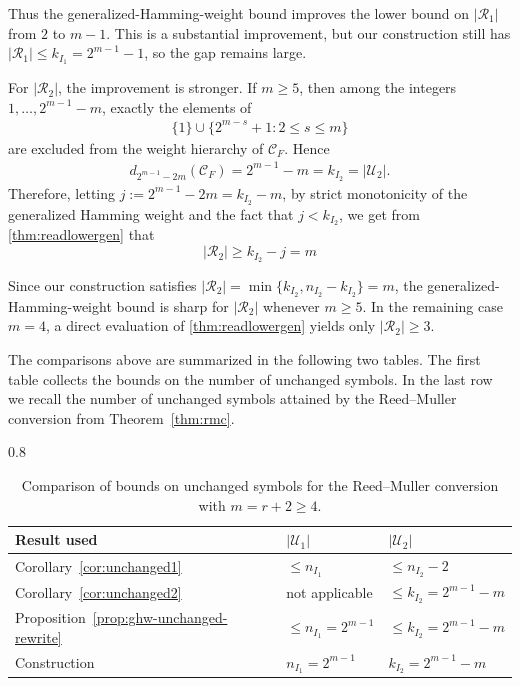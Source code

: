 \documentclass[conference, 10pt]{IEEEtran}
\theoremstyle{plain}
\theoremstyle{definition}
\newcommand{\mC}{\mathcal{C}}
\newcommand{\mU}{\mathcal{U}}
\newcommand{\mR}{\mathcal{R}}
\begin{document}
Thus the generalized-Hamming-weight bound improves the lower bound on $|\mR_1|$ from $2$ to $m-1$. This is a substantial improvement, but our construction still has $|\mR_1|\le k_{I_1}=2^{m-1}-1$, so the gap remains large.

For $|\mR_2|$, the improvement is stronger. If $m\ge 5$, then among the integers $1,\dots,2^{m-1}-m$, exactly the elements of
\begin{align*}
    \{1\}\cup \{2^{m-s}+1 : 2\le s\le m\}
\end{align*}
are excluded from the weight hierarchy of $\mC_F$. Hence
\begin{align*}
    d_{2^{m-1}-2m}(\mC_F)=2^{m-1}-m = k_{I_2} = |\mU_2|.
\end{align*}
Therefore, letting $j :=2^{m-1}-2m=k_{I_2}-m$, by strict monotonicity of the generalized Hamming weight and the fact that $j < k_{I_2}$, we get from  \cref{thm:readlowergen} that
$$|\mR_2| \geq k_{I_2} - j = m$$

Since our construction satisfies $|\mR_2|=\min\{k_{I_2},n_{I_2}-k_{I_2}\}=m$, the generalized-Hamming-weight bound is sharp for $|\mR_2|$ whenever $m\ge 5$. In the remaining case $m=4$, a direct evaluation of \cref{thm:readlowergen} yields only $|\mR_2|\ge 3$.

The comparisons above are summarized in the following two tables. The first table collects the bounds on the number of unchanged symbols. In the last row we recall the number of unchanged symbols attained by the Reed--Muller conversion from Theorem~\ref{thm:rmc}.
\begin{table}[h!]\centering
\caption{Comparison of bounds on unchanged symbols for the Reed--Muller conversion with $m=r+2\ge 4$.}
\label{tab:rm-unchanged-comparison}
\begin{scalebox}{0.8}{
\begin{tabular}{l|l|l}
\toprule
Result used & $|\mU_1|$ & $|\mU_2|$ \\
\midrule
Corollary~\ref{cor:unchanged1} & $\le n_{I_1}$ & $\le n_{I_2}-2$ \\
Corollary~\ref{cor:unchanged2} & not applicable & $\le k_{I_2}=2^{m-1}-m$ \\
Proposition~\ref{prop:ghw-unchanged-rewrite} & $\le n_{I_1}=2^{m-1}$ & $\le k_{I_2}=2^{m-1}-m$ \\
\midrule
Construction & $n_{I_1}=2^{m-1}$ & $k_{I_2}=2^{m-1}-m$ \\
\bottomrule
\end{tabular}
}\end{scalebox}

\end{table}
\end{document}
